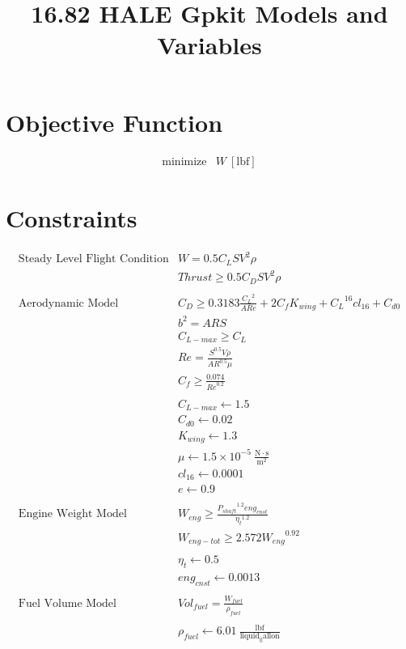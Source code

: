 \documentclass[10pt, a4paper]{article}
\begin{document}
\title{16.82 HALE Gpkit Models and Variables}
\maketitle


\section*{Objective Function}

\[ \begin{array}{ll}

\text{minimize}
    & {W}\mathrm{~\left[ lbf \right]} 
\end{array} \]
    
\section*{Constraints}

\[ \begin{array}{ll} 
\text{Steady Level Flight Condition}
    & {W} = 0.5{C_L} {S} {V}^{2} {\rho} \\
    & {Thrust} \geq 0.5{C_D} {S} {V}^{2} {\rho} \\
\text{} \\
\text{Aerodynamic Model}
    & {C_D} \geq 0.3183\frac{{C_L}^{2}}{{AR} {e}} + 2{C_f} {K_{wing}} + {C_L}^{16} {cl_{16}} + {C_{d0}} \\
    & {b}^{2} = {AR} {S} \\
    & {C_{L-max}} \geq {C_L} \\
    & {Re} = \frac{{S}^{0.5} {V} {\rho}}{{AR}^{0.5} {\mu}} \\
    & {C_f} \geq \frac{0.074}{{Re}^{0.2}} \\
    \text{} \\
    & {C_{L-max}} \gets 1.5 \\
    & {C_{d0}} \gets 0.02 \\
    & {K_{wing}} \gets 1.3 \\
    & {\mu} \gets 1.5 \times 10^{-5}~\mathrm{\tfrac{N\cdot s}{m^{2}}} \\
    & {cl_{16}} \gets 0.0001 \\
    & {e} \gets 0.9 \\
\text{} \\
\text{Engine Weight Model}
    & {W_{eng}} \geq \frac{{P_{shaft}}^{1.2} {eng_{cnst}}}{{\eta_t}^{1.2}} \\
    & {W_{eng-tot}} \geq 2.572{W_{eng}}^{0.92} \\
    \text{} \\
    & {\eta_t} \gets 0.5 \\
    & {eng_{cnst}} \gets 0.0013 \\
\text{} \\
\text{Fuel Volume Model}
    & {Vol_{fuel}} = \frac{{W_{fuel}}}{{\rho_{fuel}}} \\
    \text{} \\
    & {\rho_{fuel}} \gets 6.01~\mathrm{\tfrac{lbf}{liquid_gallon}} \\
    \end{array} \]
    
\end{document}
